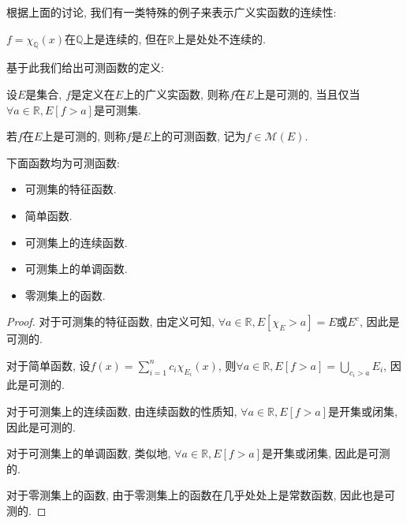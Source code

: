 \documentclass[theorem=false,mathfont=none,openany,sub3section]{easybook}
\begin{document}
根据上面的讨论, 我们有一类特殊的例子来表示广义实函数的连续性:\par

\begin{example}
  $f=\chi_{\mathbb{Q}}(x)$在$\mathbb{Q}$上是连续的, 但在$\mathbb{R}$上是处处不连续的.\par
\end{example}

基于此我们给出可测函数的定义:\par

\begin{definition}
  设$E$是集合, $f$是定义在$E$上的广义实函数, 则称$f$在$E$上是可测的, 当且仅当$\forall a\in \mathbb{R}, E[f> a]$是可测集.\par
  若$f$在$E$上是可测的, 则称$f$是$E$上的可测函数, 记为$f\in \mathcal{M}(E)$.\par
\end{definition}

\begin{theorem}
  下面函数均为可测函数:\par
  \begin{itemize}
    \item 可测集的特征函数.\par
    \item 简单函数.\par
    \item 可测集上的连续函数.\par
    \item 可测集上的单调函数.\par
    \item 零测集上的函数.\par
  \end{itemize}
\end{theorem}

\begin{proof}
  对于可测集的特征函数, 由定义可知, $\forall a\in \mathbb{R}, E[\chi_E > a] = E$或$E^c$, 因此是可测的.\par
  对于简单函数, 设$f(x)=\sum_{i=1}^{n}c_i\chi_{E_i}(x)$, 则$\forall a\in \mathbb{R}, E[f>a]=\bigcup_{c_i>a}E_i$, 因此是可测的.\par
  对于可测集上的连续函数, 由连续函数的性质知, $\forall a\in \mathbb{R}, E[f>a]$是开集或闭集, 因此是可测的.\par
  对于可测集上的单调函数, 类似地, $\forall a\in \mathbb{R}, E[f>a]$是开集或闭集, 因此是可测的.\par
  对于零测集上的函数, 由于零测集上的函数在几乎处处上是常数函数, 因此也是可测的.\par
\end{proof}
\end{document}
